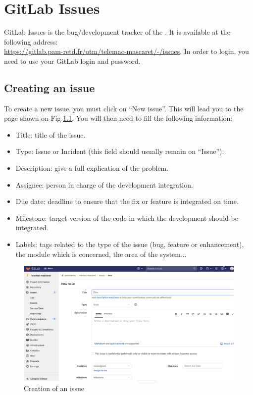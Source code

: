 %
\chapter{GitLab Issues}
%
GitLab Issues is the bug/development tracker of the \telemacsystem. It is
available at the following address:\\
\url{https://gitlab.pam-retd.fr/otm/telemac-mascaret/-/issues}.
In order to login, you need to use your GitLab login and password.
%
%
\section{Creating an issue}
%
%
To create a new issue, you must click on ``New issue''. This will lead you to
the page shown on Fig \ref{fig:gitlab-issue}. You will then need to fill the
following information:
\begin{itemize}
\item Title: title of the issue.
\item Type: Issue or Incident (this field should usually remain on ``Issue'').
\item Description: give a full explication of the problem.
\item Assignee: person in charge of the development integration.
\item Due date: deadline to ensure that the fix or feature is integrated on
  time.
\item Milestone: target version of the code in which the development should be
  integrated.
\item Labels: tags related to the type of the issue (bug, feature or
enhancement), the module which is concerned, the area of the system...
\end{itemize}
\begin{figure}[H]
    \centering
    \includegraphics[scale=0.3]{graphics/issue-creation.png}
    \caption{Creation of an issue}
    \label{fig:gitlab-issue}
\end{figure}
%
%
